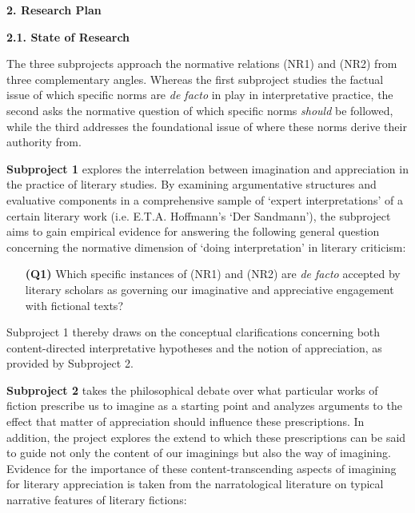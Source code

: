 \noindent\textbf{\large 2.  Research Plan}

\noindent\textbf{2.1.  State of Research}

\noindent The three subprojects approach the normative relations (NR1) and (NR2) from three complementary angles. Whereas the first subproject studies the factual issue of which specific norms are \emph{de facto} in play in interpretative practice, the second asks the normative question of which specific norms \emph{should} be followed, while the third addresses the foundational issue of where these norms derive their authority from.

\textbf{Subproject 1} explores the interrelation between imagination and appreciation in the practice of literary studies. By examining argumentative structures and evaluative components in a comprehensive sample of `expert interpretations' of a certain literary work (i.e. E.T.A. Hoffmann's `Der Sandmann'), the subproject aims to gain empirical evidence for answering the following general question concerning the normative dimension of `doing interpretation' in literary criticism:

\vspace{-.1cm}
\begin{itemize}[leftmargin=2cm]
\item[\textbf{(Q1)}] Which specific instances of (NR1) and (NR2) are \emph{de facto} accepted by literary scholars as governing our imaginative and appreciative engagement with fictional texts?
\end{itemize}
\vspace{-.1cm}

\noindent Subproject 1 thereby draws on the conceptual clarifications concerning both content-directed interpretative hypotheses and the notion of appreciation, as provided by Subproject 2.

\vspace{.2cm}
\noindent\textbf{Subproject 2} takes the philosophical debate over what particular works of fiction prescribe us to imagine as a starting point and analyzes arguments to the effect that matter of appreciation should influence these prescriptions. In addition, the project explores the extend to which these prescriptions can be said to guide not only the content of our imaginings but also the way of imagining. Evidence for the importance of these content-transcending aspects of imagining for literary appreciation is taken from the narratological literature on typical narrative features of literary fictions:

